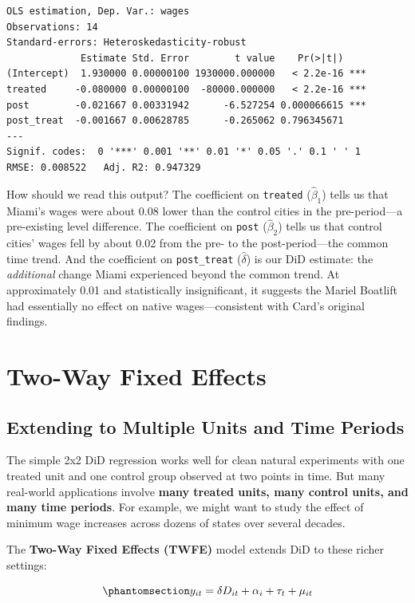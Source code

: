 \documentclass[
  letterpaper,
  DIV=11,
  numbers=noendperiod]{scrreprt}
\begin{document}
\begin{verbatim}
OLS estimation, Dep. Var.: wages
Observations: 14
Standard-errors: Heteroskedasticity-robust 
             Estimate Std. Error        t value    Pr(>|t|)    
(Intercept)  1.930000 0.00000100 1930000.000000   < 2.2e-16 ***
treated     -0.080000 0.00000100  -80000.000000   < 2.2e-16 ***
post        -0.021667 0.00331942      -6.527254 0.000066615 ***
post_treat  -0.001667 0.00628785      -0.265062 0.796345671    
---
Signif. codes:  0 '***' 0.001 '**' 0.01 '*' 0.05 '.' 0.1 ' ' 1
RMSE: 0.008522   Adj. R2: 0.947329
\end{verbatim}

How should we read this output? The coefficient on \texttt{treated}
(\(\hat{\beta}_1\)) tells us that Miami's wages were about 0.08 lower
than the control cities in the pre-period---a pre-existing level
difference. The coefficient on \texttt{post} (\(\hat{\beta}_2\)) tells
us that control cities' wages fell by about 0.02 from the pre- to the
post-period---the common time trend. And the coefficient on
\texttt{post\_treat} (\(\hat{\delta}\)) is our DiD estimate: the
\emph{additional} change Miami experienced beyond the common trend. At
approximately 0.01 and statistically insignificant, it suggests the
Mariel Boatlift had essentially no effect on native wages---consistent
with Card's original findings.

\section{Two-Way Fixed Effects}\label{two-way-fixed-effects}

\subsection{Extending to Multiple Units and Time
Periods}\label{extending-to-multiple-units-and-time-periods}

The simple 2x2 DiD regression works well for clean natural experiments
with one treated unit and one control group observed at two points in
time. But many real-world applications involve \textbf{many treated
units, many control units, and many time periods}. For example, we might
want to study the effect of minimum wage increases across dozens of
states over several decades.

The \textbf{Two-Way Fixed Effects (TWFE)} model extends DiD to these
richer settings:

\begin{equation}\protect\phantomsection\label{eq-twfe}{
y_{it} = \delta D_{it} + \alpha_i + \tau_t + \mu_{it}
}\end{equation}
\end{document}
